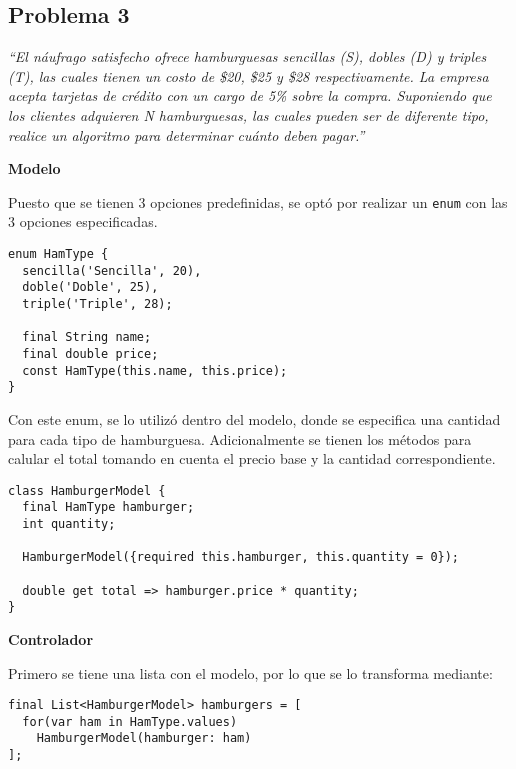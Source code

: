 \subsection{Problema 3}

\textit {“El náufrago satisfecho ofrece hamburguesas sencillas (S), dobles (D) y triples (T), las cuales tienen un costo de \$20, \$25 y \$28 respectivamente. La empresa acepta tarjetas de crédito con un cargo de 5\% sobre la compra. Suponiendo que los clientes adquieren N hamburguesas, las cuales pueden ser de diferente tipo, realice un algoritmo para determinar cuánto deben pagar.”}

\textbf{Modelo}

Puesto que se tienen 3 opciones predefinidas, se optó por realizar un \lstinline{enum} con las 3 opciones especificadas.

\begin{center}
\begin{lstlisting}
enum HamType {
  sencilla('Sencilla', 20),
  doble('Doble', 25),
  triple('Triple', 28);

  final String name;
  final double price;
  const HamType(this.name, this.price);
}
\end{lstlisting}
\end{center}

Con este enum, se lo utilizó dentro del modelo, donde se especifica una cantidad para cada tipo de hamburguesa. Adicionalmente se tienen los métodos para calular el total tomando en cuenta el precio base y la cantidad correspondiente.

\begin{center}
\begin{lstlisting}
class HamburgerModel {
  final HamType hamburger;
  int quantity;

  HamburgerModel({required this.hamburger, this.quantity = 0});

  double get total => hamburger.price * quantity;
}
\end{lstlisting}
\end{center}

\textbf{Controlador}

Primero se tiene una lista con el modelo, por lo que se lo transforma mediante:

\begin{center}
\begin{lstlisting}
final List<HamburgerModel> hamburgers = [
  for(var ham in HamType.values)
    HamburgerModel(hamburger: ham)
];
\end{lstlisting}
\end{center}

